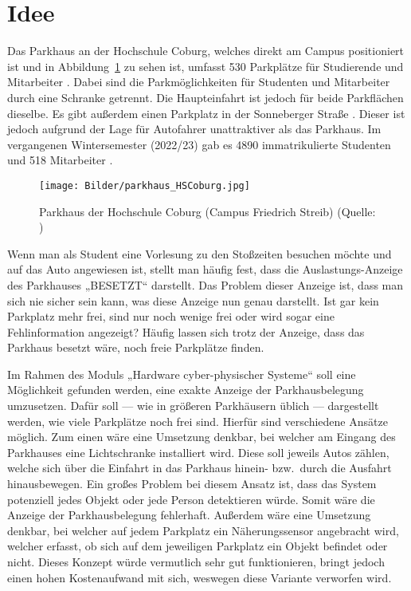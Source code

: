 \section{Idee}\label{ch:Einleitung}
Das Parkhaus an der Hochschule Coburg, welches direkt am Campus positioniert ist und in Abbildung~\ref{fig:Parkhaus} zu sehen ist, umfasst 530 Parkplätze für Studierende und Mitarbeiter \cite{parkhaus}.
Dabei sind die Parkmöglichkeiten für Studenten und Mitarbeiter durch eine Schranke getrennt.
Die Haupteinfahrt ist jedoch für beide Parkflächen dieselbe.
Es gibt außerdem einen Parkplatz in der Sonneberger Straße \cite{anfahrt}.
Dieser ist jedoch aufgrund der Lage für Autofahrer unattraktiver als das Parkhaus.
Im vergangenen Wintersemester (2022/23) gab es 4890 immatrikulierte Studenten und 518 Mitarbeiter \cite{HSCoburgZahlen}.

\begin{figure}[h]
	\myImagePos{}
	\texttt{[image: Bilder/parkhaus\_HSCoburg.jpg]}
	\caption[Parkhaus der Hochschule Coburg]{Parkhaus der Hochschule Coburg (Campus Friedrich Streib) (Quelle: \cite{parkhaus})}
	\label{fig:Parkhaus}
\end{figure}

Wenn man als Student eine Vorlesung zu den Stoßzeiten besuchen möchte und auf das Auto angewiesen ist, stellt man häufig fest, dass die Auslastungs-Anzeige des Parkhauses „BESETZT“ darstellt.
Das Problem dieser Anzeige ist, dass man sich nie sicher sein kann, was diese Anzeige nun genau darstellt.
Ist gar kein Parkplatz mehr frei, sind nur noch wenige frei oder wird sogar eine Fehlinformation angezeigt?
Häufig lassen sich trotz der Anzeige, dass das Parkhaus besetzt wäre, noch freie Parkplätze finden.

Im Rahmen des Moduls „Hardware cyber-physischer Systeme“ soll eine Möglichkeit gefunden werden, eine exakte Anzeige der Parkhausbelegung umzusetzen.
Dafür soll --- wie in größeren Parkhäusern üblich --- dargestellt werden, wie viele Parkplätze noch frei sind.
Hierfür sind verschiedene Ansätze möglich.
Zum einen wäre eine Umsetzung denkbar, bei welcher am Eingang des Parkhauses eine Lichtschranke installiert wird.
Diese soll jeweils Autos zählen, welche sich über die Einfahrt in das Parkhaus hinein- bzw.\ durch die Ausfahrt hinausbewegen.
Ein großes Problem bei diesem Ansatz ist, dass das System potenziell jedes Objekt oder jede Person detektieren würde.
Somit wäre die Anzeige der Parkhausbelegung fehlerhaft.
Außerdem wäre eine Umsetzung denkbar, bei welcher auf jedem Parkplatz ein Näherungssensor angebracht wird, welcher erfasst, ob sich auf dem jeweiligen Parkplatz ein Objekt befindet oder nicht.
Dieses Konzept würde vermutlich sehr gut funktionieren, bringt jedoch einen hohen Kostenaufwand mit sich, weswegen diese Variante verworfen wird.


